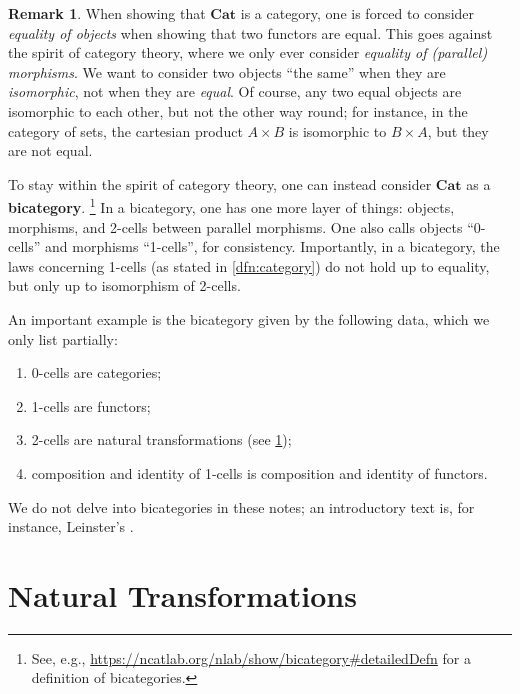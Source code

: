 \documentclass[a4paper,11pt, oneside,titlepage=false]{scrbook}
\theoremstyle{plain}
\theoremstyle{definition}
\newtheorem{rem}[thm]{Remark}
\newcommand{\Catb}[1]{\mathbf{#1}}
\newcommand{\CAT}{\Catb{Cat}}
\begin{document}
\begin{rem}
  When showing that $\CAT$ is a category, one is forced to consider \emph{equality of objects} when showing that two functors are equal.
  This goes against the spirit of category theory, where we only ever consider \emph{equality of (parallel) morphisms}.
  We want to consider two objects ``the same'' when they are \emph{isomorphic}, not when they are \emph{equal}. Of course, any two equal objects are isomorphic to each other, but not the other way round; for instance, in the category of sets, the cartesian product $A \times B$ is isomorphic to $B \times A$, but they are not equal.

  To stay within the spirit of category theory, one can instead consider $\CAT$ as a \textbf{bicategory}.%
  \footnote{See, e.g.,   \url{https://ncatlab.org/nlab/show/bicategory\#detailedDefn} for a definition of bicategories.}
  In a bicategory, one has one more layer of things: objects, morphisms, and 2-cells between parallel morphisms. One also calls objects ``0-cells'' and morphisms ``1-cells'', for consistency.
  Importantly, in a bicategory, the laws concerning 1-cells (as stated in \cref{dfn:category}) do not hold up to equality, but only up to isomorphism of 2-cells.

  An important example is the bicategory given by the following data, which we only list partially:
  \begin{enumerate}
  \item 0-cells are categories;
  \item 1-cells are functors;
  \item 2-cells are natural transformations (see \cref{sec:nat-trans});
  \item composition and identity of 1-cells is composition and identity of functors.
  \end{enumerate}

  We do not delve into bicategories in these notes; an introductory text is, for instance, Leinster's \cite{leinster:basic-bicats}.
\end{rem}




\chapter{Natural Transformations}
\label{sec:nat-trans}
\end{document}
